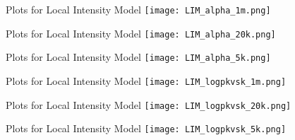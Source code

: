 \begin{frame}{Plots for Local Intensity Model}
	\texttt{[image: LIM\_alpha\_1m.png]}
\end{frame}
\begin{frame}{Plots for Local Intensity Model}
	\texttt{[image: LIM\_alpha\_20k.png]}
	\end{frame}
\begin{frame}{Plots for Local Intensity Model}
	\texttt{[image: LIM\_alpha\_5k.png]}
\end{frame}

\begin{frame}{Plots for Local Intensity Model}
	\texttt{[image: LIM\_logpkvsk\_1m.png]}
\end{frame}
\begin{frame}{Plots for Local Intensity Model}
	\texttt{[image: LIM\_logpkvsk\_20k.png]}
\end{frame}
\begin{frame}{Plots for Local Intensity Model}
	\texttt{[image: LIM\_logpkvsk\_5k.png]}
\end{frame}

